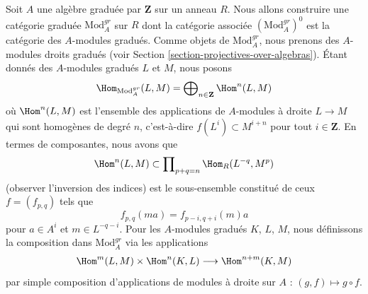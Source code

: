 \begin{example}
\label{example-gm-gr-cat}
Soit $A$ une algèbre graduée par $\mathbf{Z}$ sur un anneau $R$. Nous allons
construire une catégorie graduée $\text{Mod}^{gr}_A$ sur $R$ dont la catégorie
associée $(\text{Mod}^{gr}_A)^0$ est la catégorie des $A$-modules gradués. Comme
objets de $\text{Mod}^{gr}_A$, nous prenons des $A$-modules droits gradués (voir
Section \ref{section-projectives-over-algebras}). Étant donnés des $A$-modules
gradués $L$ et $M$, nous posons
$$
\Hom_{\text{Mod}^{gr}_A}(L, M) =
\bigoplus\nolimits_{n \in \mathbf{Z}} \Hom^n(L, M)
$$
où $\Hom^n(L, M)$ est l'ensemble des applications de $A$-modules à droite $L
\to M$ qui sont homogènes de degré $n$, c'est-à-dire $f(L^i) \subset M^{i + n}$
pour tout $i \in \mathbf{Z}$. En termes de composantes, nous avons que
$$
\Hom^n(L, M) \subset \prod\nolimits_{p + q = n} \Hom_R(L^{-q}, M^p)
$$
(observer l'inversion des indices) est le sous-ensemble constitué de ceux $f =
(f_{p, q})$ tels que
$$
f_{p, q}(m a) = f_{p - i, q + i}(m)a
$$
pour $a \in A^i$ et $m \in L^{-q - i}$. Pour les $A$-modules gradués $K$, $L$,
$M$, nous définissons la composition dans $\text{Mod}^{gr}_A$ via les applications
$$
\Hom^m(L, M) \times \Hom^n(K, L) \longrightarrow \Hom^{n + m}(K, M)
$$
par simple composition d'applications de modules à droite sur $A$ : $(g, f) \mapsto g \circ f$.
\end{example}

